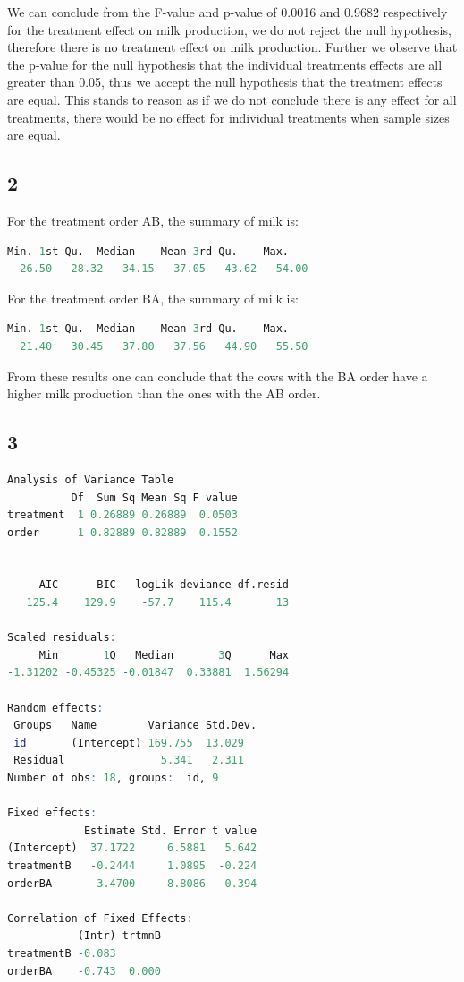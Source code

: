 \documentclass{article}
\begin{document}
    We can conclude from the F-value and p-value of 0.0016 and 0.9682 respectively for the treatment effect on milk production, we do not reject the null hypothesis, therefore there is no treatment effect on milk production. Further we observe that the p-value for the null hypothesis that the individual treatments effects are all greater than 0.05, thus we accept the null hypothesis that the treatment effects are equal. This stands to reason as if we do not conclude there is any effect for all treatments, there would be no effect for individual treatments when sample sizes are equal.
    
    \subsection*{2}
      For the treatment order AB, the summary of milk is:
	\begin{lstlisting}[language=R]
   Min. 1st Qu.  Median    Mean 3rd Qu.    Max. 
  26.50   28.32   34.15   37.05   43.62   54.00 
    \end{lstlisting}
      For the treatment order BA, the summary of milk is:
  \begin{lstlisting}[language=R]
   Min. 1st Qu.  Median    Mean 3rd Qu.    Max. 
  21.40   30.45   37.80   37.56   44.90   55.50  
    \end{lstlisting}
      From these results one can conclude that the cows with the BA order have a higher milk production than the ones with the AB order.

    \subsection*{3}
    \begin{lstlisting}[language=R]
    Analysis of Variance Table
          Df  Sum Sq Mean Sq F value
treatment  1 0.26889 0.26889  0.0503
order      1 0.82889 0.82889  0.1552


     AIC      BIC   logLik deviance df.resid 
   125.4    129.9    -57.7    115.4       13 
   
Scaled residuals: 
     Min       1Q   Median       3Q      Max 
-1.31202 -0.45325 -0.01847  0.33881  1.56294 

Random effects:
 Groups   Name        Variance Std.Dev.
 id       (Intercept) 169.755  13.029  
 Residual               5.341   2.311  
Number of obs: 18, groups:  id, 9

Fixed effects:
            Estimate Std. Error t value
(Intercept)  37.1722     6.5881   5.642
treatmentB   -0.2444     1.0895  -0.224
orderBA      -3.4700     8.8086  -0.394

Correlation of Fixed Effects:
           (Intr) trtmnB
treatmentB -0.083       
orderBA    -0.743  0.000
    \end{lstlisting}
\end{document}
